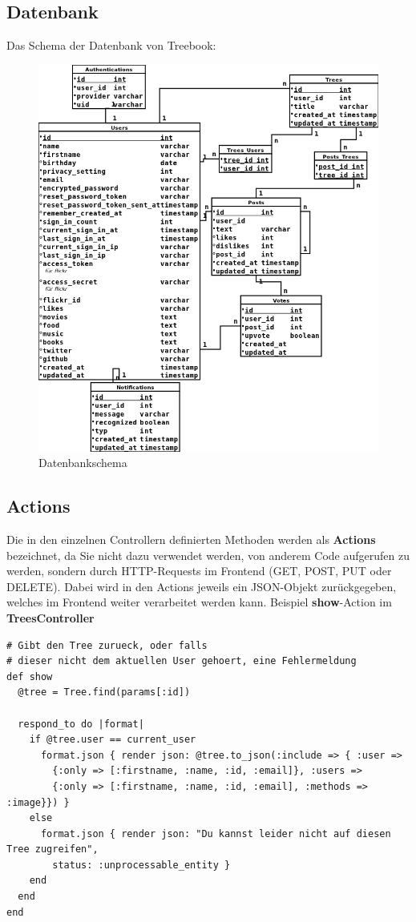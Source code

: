 \documentclass[10pt,a4paper]{book}
\makeatletter
\def\ScaleIfNeeded{%
\ifdim\Gin@nat@width>\linewidth
\linewidth
\else
\Gin@nat@width
\fi
}
\makeatother
\begin{document}
\subsection{Datenbank}
Das Schema der Datenbank von Treebook:
\newpage
\begin{figure}[htbp]
\centering
\includegraphics[width=\ScaleIfNeeded]{Pictures/db.png}%
\caption{Datenbankschema}%
\end{figure}

\subsection{Actions}
Die in den einzelnen Controllern definierten Methoden werden als \textbf{Actions} bezeichnet, da Sie nicht dazu verwendet werden, von anderem Code aufgerufen zu werden, sondern durch HTTP-Requests im Frontend (GET, POST, PUT oder DELETE). Dabei wird in den Actions jeweils ein JSON-Objekt zurückgegeben, welches im Frontend weiter verarbeitet werden kann.
Beispiel \textbf{show}-Action im \textbf{TreesController}
\begin{lstlisting}
# Gibt den Tree zurueck, oder falls
# dieser nicht dem aktuellen User gehoert, eine Fehlermeldung
def show
  @tree = Tree.find(params[:id])

  respond_to do |format|
    if @tree.user == current_user
      format.json { render json: @tree.to_json(:include => { :user => 
      	{:only => [:firstname, :name, :id, :email]}, :users => 
      	{:only => [:firstname, :name, :id, :email], :methods => :image}}) }
    else
      format.json { render json: "Du kannst leider nicht auf diesen Tree zugreifen", 
      	status: :unprocessable_entity }
    end
  end
end
\end{lstlisting}
\end{document}

